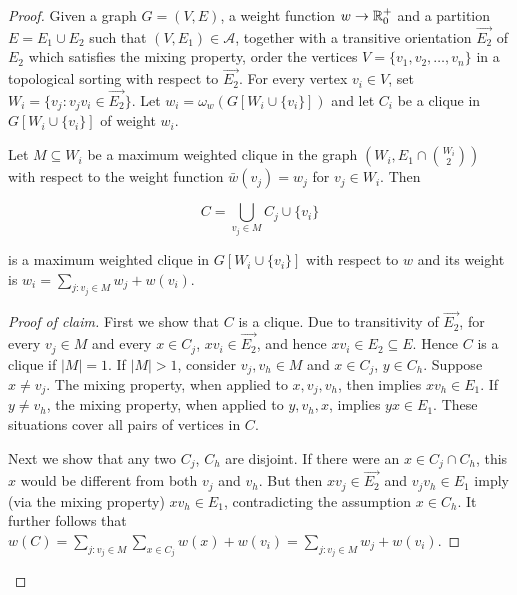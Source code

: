 \begin{proof}
	Given a graph $G = (V, E)$, a weight function $w \to \mathbb{R}_0^+$ and a partition $E = E_1 \cup E_2$ such that $(V, E_1) \in \mathcal{A}$, together with a transitive orientation $\overrightarrow{E_2}$ of $E_2$ which satisfies the mixing property, order the vertices $V = \{v_1 , v_2 , \dots , v_n\}$ in a topological sorting with respect to $\overrightarrow{E_2}$. For every vertex $v_i \in V$, set $W_i = \{v_j : v_j v_i \in \overrightarrow{E_2}\}$. Let $w_i = \omega_w (G[W_i \cup \{v_i\}])$ and let $C_i$ be a clique in $G[W_i \cup \{v_i\}]$ of weight $w_i$.
	
	\begin{claim}
		Let $M \subseteq W_i$ be a maximum weighted clique in the graph $(W_i , E_1 \cap \binom{W_i}{2})$ with respect to the weight function $\bar{w}(v_j) = w_j$ for $v_j \in W_i$. Then
		
		$$
		C = \bigcup_{v_j \in M} C_j \cup \{v_i\}
		$$
		
		is a maximum weighted clique in $G[W_i \cup \{v_i\}]$ with respect to $w$ and its weight is $w_i = \sum_{j: v_j \in M} w_j + w(v_i)$.
	\end{claim}
	
	\begin{proof}[Proof of claim]
		First we show that $C$ is a clique. Due to transitivity of $\overrightarrow{E_2}$, for every $v_j \in M$ and every $x \in C_j$, $xv_i \in \overrightarrow{E_2}$, and hence $xv_i \in E_2 \subseteq E$. Hence $C$ is a clique if $|M| = 1$. If $|M| > 1$, consider $v_j, v_h \in M$ and $x \in C_j$, $y \in C_h$. Suppose $x \neq v_j$. The mixing property, when applied to $x, v_j , v_h$, then implies $xv_h \in E_1$. If $y \neq v_h$, the mixing property, when applied to $y, v_h , x$, implies $yx \in E_1$. These situations cover all pairs of vertices in $C$.
		
		Next we show that any two $C_j$, $C_h$ are disjoint. If there were an $x \in C_j \cap C_h$, this $x$ would be different from both $v_j$ and $v_h$. But then $xv_j \in \overrightarrow{E_2}$ and $v_j v_h \in E_1$ imply (via the mixing property) $xv_h \in E_1$, contradicting the assumption $x \in C_h$. It further follows that $w(C) = \sum_{j:v_j \in M} \sum_{x \in C_j} w(x) + w(v_i) = \sum_{j:v_j \in M} w_j + w(v_i)$.
		

\end{proof}
\end{proof}
